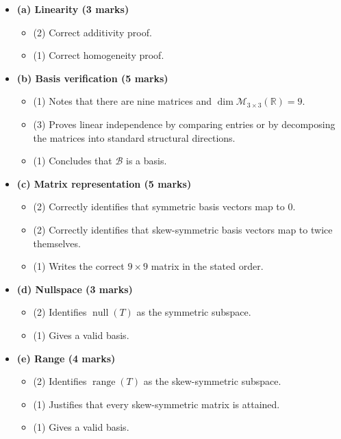 \documentclass[12pt]{article}
\newcommand{\R}{\mathbb{R}}
\newcommand{\M}{\mathcal{M}}
\newcommand{\B}{\mathcal{B}}
\newcommand{\Null}{\operatorname{null}}
\newcommand{\Range}{\operatorname{range}}
\begin{document}
\begin{itemize}[leftmargin=1.6em]
  \item \textbf{(a) Linearity (3 marks)}
  \begin{itemize}[leftmargin=1.6em]
    \item (2) Correct additivity proof.
    \item (1) Correct homogeneity proof.
  \end{itemize}
  \item \textbf{(b) Basis verification (5 marks)}
  \begin{itemize}[leftmargin=1.6em]
    \item (1) Notes that there are nine matrices and $\dim\M_{3\times3}(\R)=9$.
    \item (3) Proves linear independence by comparing entries or by decomposing the matrices into standard structural directions.
    \item (1) Concludes that $\B$ is a basis.
  \end{itemize}
  \item \textbf{(c) Matrix representation (5 marks)}
  \begin{itemize}[leftmargin=1.6em]
    \item (2) Correctly identifies that symmetric basis vectors map to $0$.
    \item (2) Correctly identifies that skew-symmetric basis vectors map to twice themselves.
    \item (1) Writes the correct $9\times9$ matrix in the stated order.
  \end{itemize}
  \item \textbf{(d) Nullspace (3 marks)}
  \begin{itemize}[leftmargin=1.6em]
    \item (2) Identifies $\Null(T)$ as the symmetric subspace.
    \item (1) Gives a valid basis.
  \end{itemize}
  \item \textbf{(e) Range (4 marks)}
  \begin{itemize}[leftmargin=1.6em]
    \item (2) Identifies $\Range(T)$ as the skew-symmetric subspace.
    \item (1) Justifies that every skew-symmetric matrix is attained.
    \item (1) Gives a valid basis.
  \end{itemize}
\end{itemize}
\end{document}
